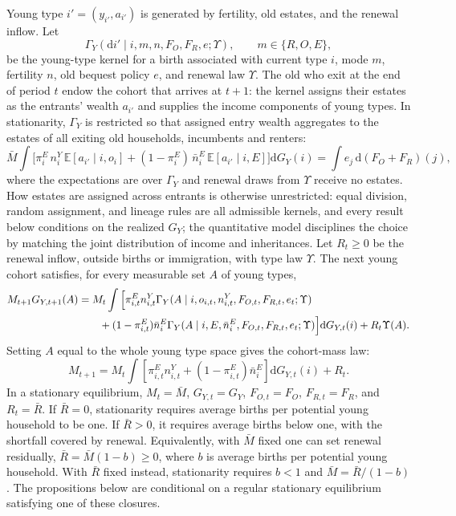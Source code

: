 \documentclass[11pt]{article}
\newcommand{\dd}{\mathrm d}
\newcommand{\E}{\mathbb E}
\newcommand{\1}{\mathbf 1}
\begin{document}
Young type $i'=(y_{i'},a_{i'})$ is generated by fertility, old estates, and the renewal inflow. Let
\[
\Gamma_Y(\dd i'\mid i,m,n,F_O,F_R,e;\Upsilon),
\qquad m\in\{R,O,E\},
\]
be the young-type kernel for a birth associated with current type $i$, mode $m$, fertility $n$, old bequest policy $e$, and renewal law $\Upsilon$. The old who exit at the end of period $t$ endow the cohort that arrives at $t+1$: the kernel assigns their estates as the entrants' wealth $a_{i'}$ and supplies the income components of young types. In stationarity, $\Gamma_Y$ is restricted so that assigned entry wealth aggregates to the estates of all exiting old households, incumbents and renters:
\[
\bar M\int\Big[
\pi_i^E\,n_i^{Y}\,\E\!\left[a_{i'}\mid i,o_i\right]
+(1-\pi_i^E)\,\bar n_i^E\,\E\!\left[a_{i'}\mid i,E\right]
\Big]\dd G_Y(i)
=
\int e_j\,\dd\!\left(F_O+F_R\right)(j),
\]
where the expectations are over $\Gamma_Y$ and renewal draws from $\Upsilon$ receive no estates. How estates are assigned across entrants is otherwise unrestricted: equal division, random assignment, and lineage rules are all admissible kernels, and every result below conditions on the realized $G_Y$; the quantitative model disciplines the choice by matching the joint distribution of income and inheritances. Let $R_t\ge0$ be the renewal inflow, outside births or immigration, with type law $\Upsilon$. The next young cohort satisfies, for every measurable set $A$ of young types,
\begin{align}
M_{t+1}G_{Y,t+1}(A)
&=
M_t\int
\Big[
\pi_{i,t}^E n_{i,t}^{Y}
\Gamma_Y(A\mid i,o_{i,t},n_{i,t}^{Y},F_{O,t},F_{R,t},e_t;\Upsilon)
\notag\\
&\qquad
+(1-\pi_{i,t}^E)\bar n_i^E
\Gamma_Y(A\mid i,E,\bar n_i^E,F_{O,t},F_{R,t},e_t;\Upsilon)
\Big]\dd G_{Y,t}(i)
+
R_t\Upsilon(A).
\label{eq:compact_young_transition}
\end{align}
Setting $A$ equal to the whole young type space gives the cohort-mass law:
\begin{equation}
M_{t+1}
=
M_t\int
\left[
\pi_{i,t}^E n_{i,t}^{Y}
+(1-\pi_{i,t}^E)\bar n_i^E
\right]
\dd G_{Y,t}(i)
+R_t.
\label{eq:compact_cohort_mass_law}
\end{equation}
In a stationary equilibrium, $M_t=\bar M$, $G_{Y,t}=G_Y$, $F_{O,t}=F_O$, $F_{R,t}=F_R$, and $R_t=\bar R$. If $\bar R=0$, stationarity requires average births per potential young household to be one. If $\bar R>0$, it requires average births below one, with the shortfall covered by renewal. Equivalently, with $\bar M$ fixed one can set renewal residually, $\bar R=\bar M(1-b)\ge0$, where $b$ is average births per potential young household. With $\bar R$ fixed instead, stationarity requires $b<1$ and $\bar M=\bar R/(1-b)$. The propositions below are conditional on a regular stationary equilibrium satisfying one of these closures.
\end{document}

